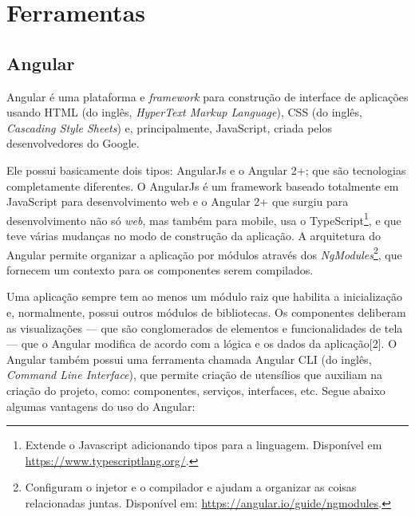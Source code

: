 \section{Ferramentas}
\label{sec:ferramentas}

\subsection{Angular}
\label{ssec:Angular}
Angular\cite{afonso2018angular} é uma plataforma e \textit{framework} para construção de interface de aplicações usando HTML (do inglês, \textit{HyperText Markup Language}), CSS (do inglês, \textit{Cascading Style Sheets}) e, principalmente, JavaScript, criada pelos desenvolvedores do Google. 

Ele possui basicamente dois tipos: AngularJs e o Angular 2+; que são tecnologias completamente diferentes. O AngularJs é um framework baseado totalmente em JavaScript para desenvolvimento web e o Angular 2+ que surgiu para desenvolvimento não só \textit{web}, mas também para mobile, usa o TypeScript\footnote{Extende o Javascript adicionando tipos para a linguagem. Disponível em \url{https://www.typescriptlang.org/}.}, e que teve várias mudanças no modo de construção da aplicação. A arquitetura do Angular permite organizar a aplicação por módulos através dos \textit{NgModules}\footnote{Configuram o injetor e o compilador e ajudam a organizar as coisas relacionadas juntas. Disponível em: \url{https://angular.io/guide/ngmodules}.}, que fornecem um contexto para os componentes serem compilados. 

Uma aplicação sempre tem ao menos um módulo raiz que habilita a inicialização e, normalmente, possui outros módulos de bibliotecas. Os componentes deliberam as visualizações — que são conglomerados de elementos e funcionalidades de tela — que o Angular modifica de acordo com a lógica e os dados da aplicação[2]. O Angular também possui uma ferramenta chamada Angular CLI (do inglês, \textit{Command Line Interface}), que permite criação de utensílios que auxiliam na criação do projeto, como: componentes, serviços, interfaces, etc. Segue abaixo algumas vantagens do uso do Angular:  

